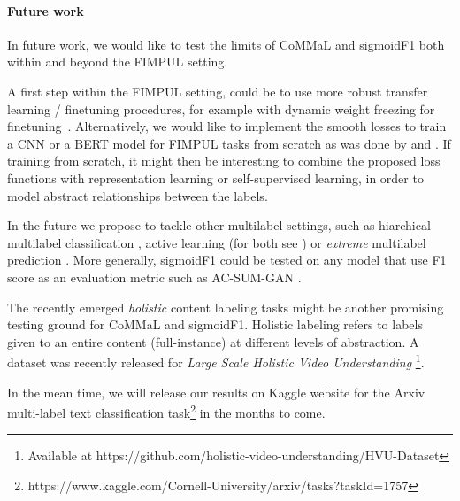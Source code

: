 



\paragraph{Future work}
In future work, we would like to test the limits of CoMMaL and sigmoidF1 both within and beyond the FIMPUL setting.


A first step within the FIMPUL setting, could be to use more robust transfer learning / finetuning procedures, for example with dynamic weight freezing for finetuning~\cite{ULMFit}. Alternatively, we would like to implement the smooth losses to train a CNN or a BERT model for FIMPUL tasks from scratch as was done by \cite{tencent} and \cite{focalLoss}. If training from scratch, it might then be interesting to combine the proposed loss functions with representation learning \cite{unsupervisedImage,highResRepresentation} or self-supervised learning, in order to model abstract relationships between the labels.

In the future we propose to tackle other multilabel settings, such as hiarchical multilabel classification \cite{HARAM},  active learning (for both see \cite{activeLearningMultiLabel}) or \emph{extreme} multilabel prediction \cite{extremeMultilabelText, extremeSIGIR}. More generally, sigmoidF1 could be tested on any model that use F1 score as an evaluation metric such as AC-SUM-GAN \cite{AC-SUM-GAN}.

The recently emerged \textit{holistic} content labeling tasks might be another promising testing ground for CoMMaL and sigmoidF1. Holistic labeling refers to labels given to an entire content (full-instance) at different levels of abstraction. A dataset was recently released for \emph{Large Scale Holistic Video Understanding} \cite{holisticVideoData}\footnote{Available at https://github.com/holistic-video-understanding/HVU-Dataset}.

\vspace{\baselineskip}

In the mean time, we will release our results on Kaggle website for the Arxiv multi-label text classification task\footnote{https://www.kaggle.com/Cornell-University/arxiv/tasks?taskId=1757} in the months to come.





